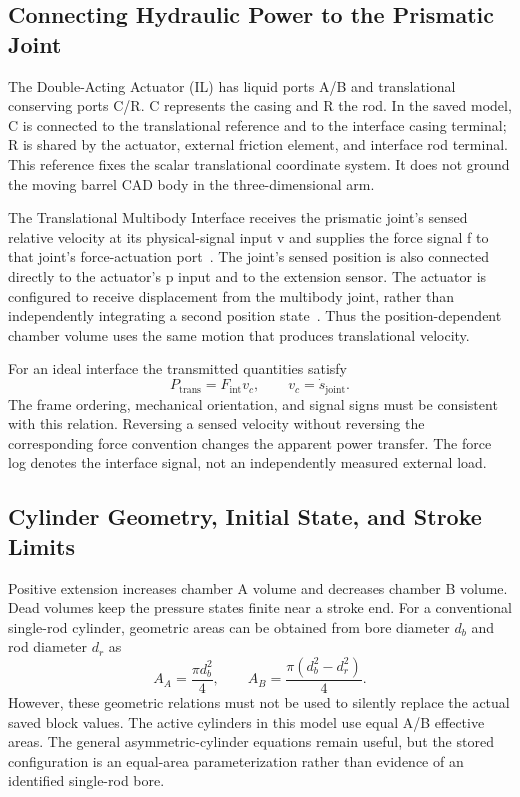 \subsection{Connecting Hydraulic Power to the Prismatic Joint}
The Double-Acting Actuator (IL) has liquid ports A/B and translational conserving ports C/R. C represents the casing and R the rod. In the saved model, C is connected to the translational reference and to the interface casing terminal; R is shared by the actuator, external friction element, and interface rod terminal. This reference fixes the scalar translational coordinate system. It does not ground the moving barrel CAD body in the three-dimensional arm.

The Translational Multibody Interface receives the prismatic joint's sensed relative velocity at its physical-signal input v and supplies the force signal f to that joint's force-actuation port~\cite{interface}. The joint's sensed position is also connected directly to the actuator's p input and to the extension sensor. The actuator is configured to receive displacement from the multibody joint, rather than independently integrating a second position state~\cite{actuator}. Thus the position-dependent chamber volume uses the same motion that produces translational velocity.

For an ideal interface the transmitted quantities satisfy
\begin{equation}
P_{\mathrm{trans}}=F_{\mathrm{int}}v_c,
\qquad v_c=\dot{s}_{\mathrm{joint}}.
\end{equation}
The frame ordering, mechanical orientation, and signal signs must be consistent with this relation. Reversing a sensed velocity without reversing the corresponding force convention changes the apparent power transfer. The force log denotes the interface signal, not an independently measured external load.

\subsection{Cylinder Geometry, Initial State, and Stroke Limits}
Positive extension increases chamber A volume and decreases chamber B volume. Dead volumes keep the pressure states finite near a stroke end. For a conventional single-rod cylinder, geometric areas can be obtained from bore diameter $d_b$ and rod diameter $d_r$ as
\begin{equation}
A_A=\frac{\pi d_b^2}{4},\qquad
A_B=\frac{\pi(d_b^2-d_r^2)}{4}.
\end{equation}
However, these geometric relations must not be used to silently replace the actual saved block values. The active cylinders in this model use equal A/B effective areas. The general asymmetric-cylinder equations remain useful, but the stored configuration is an equal-area parameterization rather than evidence of an identified single-rod bore.

